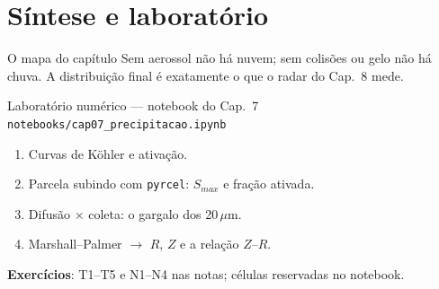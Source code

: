 \documentclass[aspectratio=169,11pt]{beamer}
\begin{document}
\section{Síntese e laboratório}

\begin{frame}{O mapa do capítulo}
  \vspace{0.6em}
  Sem aerossol não há nuvem; sem colisões ou gelo não há chuva. A
  distribuição final é exatamente o que o radar do Cap.~8 mede.
\end{frame}

\begin{frame}{Laboratório numérico --- notebook do Cap.~7}
  \texttt{notebooks/cap07\_precipitacao.ipynb}
  \begin{enumerate}
    \item Curvas de Köhler e ativação.
    \item Parcela subindo com \texttt{pyrcel}: $S_{max}$ e fração
          ativada.
    \item Difusão × coleta: o gargalo dos 20\,$\mu$m.
    \item Marshall--Palmer $\to$ $R$, $Z$ e a relação $Z$--$R$.
  \end{enumerate}
  \vspace{0.4em}
  \textbf{Exercícios}: T1--T5 e N1--N4 nas notas; células reservadas no
  notebook.
  \vfill
  \atribuicao
\end{frame}
\end{document}

